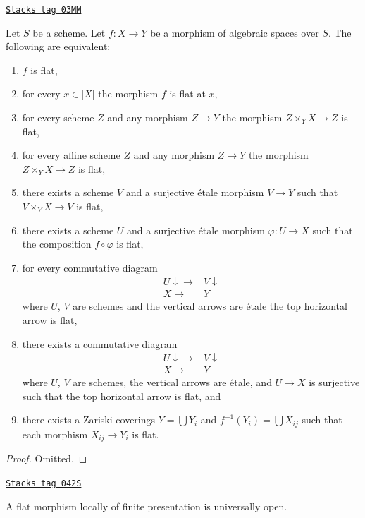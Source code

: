 \begin{lemma}
\label{spaces-morphisms-lemma-flat-local}
\href{https://stacks.math.columbia.edu/tag/03MM}{\texttt{Stacks tag 03MM}}

Let $S$ be a scheme.
Let $f : X \to Y$ be a morphism of algebraic spaces over $S$.
The following are equivalent:
\begin{enumerate}
\item $f$ is flat,
\item for every $x \in |X|$ the morphism $f$ is flat at $x$,
\item for every scheme $Z$ and any morphism $Z \to Y$ the morphism
$Z \times_Y X \to Z$ is flat,
\item for every affine scheme $Z$ and any morphism
$Z \to Y$ the morphism $Z \times_Y X \to Z$ is flat,
\item there exists a scheme $V$ and a surjective \'etale morphism
$V \to Y$ such that $V \times_Y X \to V$ is flat,
\item there exists a scheme $U$ and a surjective \'etale morphism
$\varphi : U \to X$ such that the composition $f \circ \varphi$
is flat,
\item for every commutative diagram
$$
\begin{array}{cc}U \downarrow\longrightarrow & V \downarrow \\ X \longrightarrow & Y\end{array}
$$
where $U$, $V$ are schemes and the vertical arrows are \'etale
the top horizontal arrow is flat,
\item there exists a commutative diagram
$$
\begin{array}{cc}U \downarrow\longrightarrow & V \downarrow \\ X \longrightarrow & Y\end{array}
$$
where $U$, $V$ are schemes, the vertical arrows are \'etale, and
$U \to X$ is surjective such that the top horizontal arrow is flat, and
\item there exists a Zariski coverings $Y = \bigcup Y_i$ and
$f^{-1}(Y_i) = \bigcup X_{ij}$ such that
each morphism $X_{ij} \to Y_i$ is flat.
\end{enumerate}
\end{lemma}

\begin{proof}
Omitted.
\end{proof}

\begin{lemma}
\label{spaces-morphisms-lemma-fppf-open}
\href{https://stacks.math.columbia.edu/tag/042S}{\texttt{Stacks tag 042S}}

A flat morphism locally of finite presentation is universally open.
\end{lemma}

